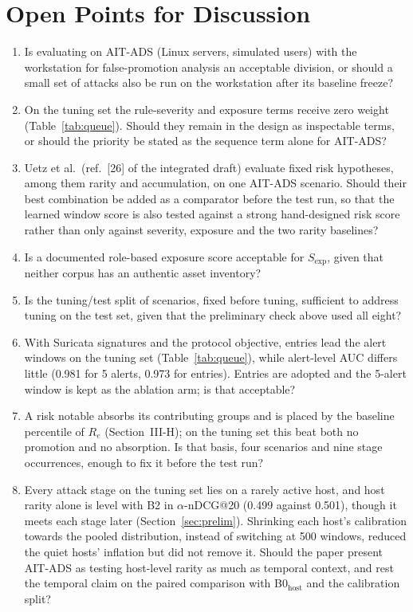 \documentclass[conference]{IEEEtran}
\begin{document}
\section{Open Points for Discussion}
\label{sec:open}

\begin{enumerate}
\item Is evaluating on AIT-ADS (Linux servers, simulated users) with the workstation for false-promotion analysis an acceptable division, or should a small set of attacks also be run on the workstation after its baseline freeze?
\item On the tuning set the rule-severity and exposure terms receive zero weight (Table~\ref{tab:queue}). Should they remain in the design as inspectable terms, or should the priority be stated as the sequence term alone for AIT-ADS?
\item Uetz et al.\ (ref.~[26] of the integrated draft) evaluate fixed risk hypotheses, among them rarity and accumulation, on one AIT-ADS scenario. Should their best combination be added as a comparator before the test run, so that the learned window score is also tested against a strong hand-designed risk score rather than only against severity, exposure and the two rarity baselines?
\item Is a documented role-based exposure score acceptable for $S_\mathrm{exp}$, given that neither corpus has an authentic asset inventory?
\item Is the tuning/test split of scenarios, fixed before tuning, sufficient to address tuning on the test set, given that the preliminary check above used all eight?
\item With Suricata signatures and the protocol objective, entries lead the alert windows on the tuning set (Table~\ref{tab:queue}), while alert-level AUC differs little (0.981 for 5 alerts, 0.973 for entries). Entries are adopted and the 5-alert window is kept as the ablation arm; is that acceptable?
\item A risk notable absorbs its contributing groups and is placed by the baseline percentile of $R_e$ (Section~III-H); on the tuning set this beat both no promotion and no absorption. Is that basis, four scenarios and nine stage occurrences, enough to fix it before the test run?
\item Every attack stage on the tuning set lies on a rarely active host, and host rarity alone is level with B2 in $\alpha$-nDCG@20 (0.499 against 0.501), though it meets each stage later (Section~\ref{sec:prelim}). Shrinking each host's calibration towards the pooled distribution, instead of switching at 500 windows, reduced the quiet hosts' inflation but did not remove it. Should the paper present AIT-ADS as testing host-level rarity as much as temporal context, and rest the temporal claim on the paired comparison with B0$_\mathrm{host}$ and the calibration split?

\end{enumerate}
\end{document}
